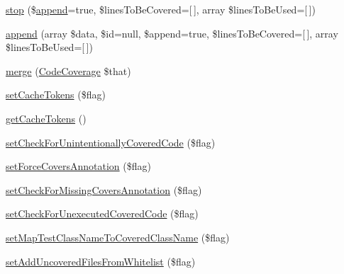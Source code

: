 \begin{DoxyCompactItemize}
\item 
\mbox{\hyperlink{class_sebastian_bergmann_1_1_code_coverage_1_1_code_coverage_aa2991d22848434e3ab488fbbbf803849}{stop}} (\$\mbox{\hyperlink{class_sebastian_bergmann_1_1_code_coverage_1_1_code_coverage_afa3516eb63cd6982dffa681809eca301}{append}}=true, \$lines\+To\+Be\+Covered=\mbox{[}$\,$\mbox{]}, array \$lines\+To\+Be\+Used=\mbox{[}$\,$\mbox{]})
\item 
\mbox{\hyperlink{class_sebastian_bergmann_1_1_code_coverage_1_1_code_coverage_afa3516eb63cd6982dffa681809eca301}{append}} (array \$data, \$id=null, \$append=true, \$lines\+To\+Be\+Covered=\mbox{[}$\,$\mbox{]}, array \$lines\+To\+Be\+Used=\mbox{[}$\,$\mbox{]})
\item 
\mbox{\hyperlink{class_sebastian_bergmann_1_1_code_coverage_1_1_code_coverage_a04b35d43796663b26e700121d470fcd5}{merge}} (\mbox{\hyperlink{class_sebastian_bergmann_1_1_code_coverage_1_1_code_coverage}{Code\+Coverage}} \$that)
\item 
\mbox{\hyperlink{class_sebastian_bergmann_1_1_code_coverage_1_1_code_coverage_a8d6be494c0faae91a22d54ebeb5d44d6}{set\+Cache\+Tokens}} (\$flag)
\item 
\mbox{\hyperlink{class_sebastian_bergmann_1_1_code_coverage_1_1_code_coverage_a9e4eaafba047966518cf9f6bea33178c}{get\+Cache\+Tokens}} ()
\item 
\mbox{\hyperlink{class_sebastian_bergmann_1_1_code_coverage_1_1_code_coverage_abdddd905c15d97e2ac919b4be5a2e871}{set\+Check\+For\+Unintentionally\+Covered\+Code}} (\$flag)
\item 
\mbox{\hyperlink{class_sebastian_bergmann_1_1_code_coverage_1_1_code_coverage_a8dd1a5b0c1b64d4653469e29fc887cfc}{set\+Force\+Covers\+Annotation}} (\$flag)
\item 
\mbox{\hyperlink{class_sebastian_bergmann_1_1_code_coverage_1_1_code_coverage_a4019571d0ffdaec6d7ed82bfc9c63a3f}{set\+Check\+For\+Missing\+Covers\+Annotation}} (\$flag)
\item 
\mbox{\hyperlink{class_sebastian_bergmann_1_1_code_coverage_1_1_code_coverage_a14b5d6d664720244707639128049c5a7}{set\+Check\+For\+Unexecuted\+Covered\+Code}} (\$flag)
\item 
\mbox{\hyperlink{class_sebastian_bergmann_1_1_code_coverage_1_1_code_coverage_a881f8559d4ae2daf76b9a2bd27dd25e5}{set\+Map\+Test\+Class\+Name\+To\+Covered\+Class\+Name}} (\$flag)
\item 
\mbox{\hyperlink{class_sebastian_bergmann_1_1_code_coverage_1_1_code_coverage_ad44544c8a0374f6e2f7ea5891e48482e}{set\+Add\+Uncovered\+Files\+From\+Whitelist}} (\$flag)

\end{DoxyCompactItemize}
